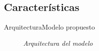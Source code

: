 \subsection{Características}
\begin{frame}{Arquitectura}{Modelo propuesto}
    \begin{figure}				
		\caption{\small \sl Arquitectura del modelo \cite{RethinkIOT,MobileEdgeComputing1,MobileEdgeComputing2,FogColony1}}
		\label{figure:Draft}
    \end{figure}
\end{frame}
